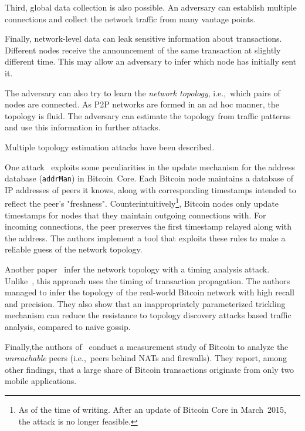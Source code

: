 Third, global data collection is also possible.
An adversary can establish multiple connections and collect the network traffic from many vantage points.

Finally, network-level data can leak sensitive information about transactions.
Different nodes receive the announcement of the same transaction at slightly different time.
This may allow an adversary to infer which node has initially sent it.

The adversary can also try to learn the \textit{network topology}, i.e.,~which pairs of nodes are connected.
As P2P networks are formed in an ad hoc manner, the topology is fluid.
The adversary can estimate the topology from traffic patterns and use this information in further attacks.

Multiple topology estimation attacks have been described.

One attack~\cite{Miller2015} exploits some peculiarities in the update mechanism for the address database (\texttt{addrMan}) in Bitcoin~Core.
Each Bitcoin node maintains a database of IP addresses of peers it knows, along with corresponding timestamps intended to reflect the peer's "freshness".
Counterintuitively\footnote{As of the time of writing. After an update of Bitcoin Core in March~2015, the attack is no longer feasible.}, Bitcoin nodes only update timestamps for nodes that they maintain outgoing connections with.
For incoming connections, the peer preserves the first timestamp relayed along with the address.
The authors implement a tool that exploits these rules to make a reliable guess of the network topology.

Another paper~\cite{Neudecker2016} infer the network topology with a timing analysis attack.
Unlike~\cite{Miller2015}, this approach uses the timing of transaction propagation.
The authors managed to infer the topology of the real-world Bitcoin network with high recall and precision.
They also show that an inappropriately parameterized trickling mechanism can reduce the resistance to topology discovery attacks based traffic analysis, compared to naive gossip.

Finally,the authors of~\cite{Wang2017} conduct a measurement study of Bitcoin to analyze the \textit{unreachable} peers (i.e.,~peers behind NATs and firewalls).
They report, among other findings, that a large share of Bitcoin transactions originate from only two mobile applications.


